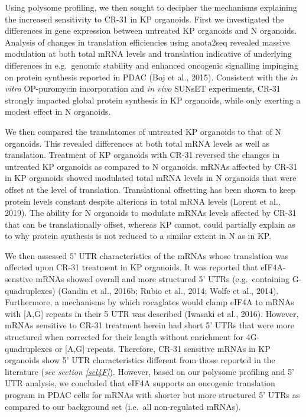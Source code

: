 \documentclass[12pt,openany]{book}
\begin{document}
Using polysome profiling, we then sought to decipher the mechanisms
explaining the increased sensitivity to CR-31 in KP organoids. First we
investigated the differences in gene expression between untreated KP
organoids and N organoids. Analysis of changes in translation
efficiencies using anota2seq revealed massive modulation at both total
mRNA levels and translation indicative of underlying differences in
e.g.~genomic stability and enhanced oncogenic signalling impinging on
protein synthesis reported in PDAC (Boj et al., 2015). Consistent with
the \emph{in vitro} OP-puromycin incorporation and \emph{in vivo} SUNsET
experiments, CR-31 strongly impacted global protein synthesis in KP
organoids, while only exerting a modest effect in N organoids.

We then compared the translatomes of untreated KP organoids to that of N
organoids. This revealed differences at both total mRNA levels as well
as translation. Treatment of KP organoids with CR-31 reversed the
changes in untreated KP organoids as compared to N organoids. mRNAs
affected by CR-31 in KP organoids showed modulated total mRNA levels in
N organoids that were offset at the level of translation. Translational
offsetting has been shown to keep protein levels constant despite
alterions in total mRNA levels (Lorent et al., 2019). The ability for N
organoids to modulate mRNAs levels affected by CR-31 that can be
translationally offset, whereas KP cannot, could partially explain as to
why protein synthesis is not reduced to a similar extent in N as in KP.

We then assessed 5' UTR characteristics of the mRNAs whose translation
was affected upon CR-31 treatment in KP organoids. It was reported that
eIF4A-senstive mRNAs showed overall and more structured 5' UTRs
(e.g.~containing G-quadruplexes) (Gandin et al., 2016b; Rubio et al.,
2014; Wolfe et al., 2014). Furthermore, a mechanisms by which rocaglates
would clamp eIF4A to mRNAs with {[}A,G{]} repeats in their 5 UTR was
described (Iwasaki et al., 2016). However, mRNAs sensitive to CR-31
treatment herein had short 5' UTRs that were more structured when
corrected for their length without enrichment for 4G-quadruplexes or
{[}A,G{]} repeats. Therefore, CR-31 sensitive mRNAs in KP organoids show
5' UTR characteristics different from those reported in the literature
(\emph{see section \ref{sel4F}}). However, based on our polysome
profiling and 5' UTR analysis, we concluded that eIF4A supports an
oncogenic translation program in PDAC cells for mRNAs with shorter but
more structured 5' UTRs as compared to our background set (i.e.~all
non-regulated mRNAs).
\end{document}
